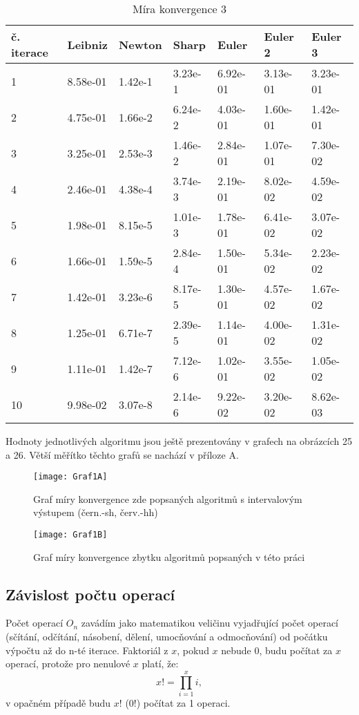\documentclass[soc]{gzwroc} %
\begin{document}
\begin{table}[h!]
\caption{Míra konvergence 3}
\begin{tabular}{|l|l|l|l|l|l|l|}
\hline
\multicolumn{1}{|l|}{\bfseries č. iterace} & \multicolumn{1}{l|}{\bfseries Leibniz} & \multicolumn{1}{l|}{\bfseries Newton} & \multicolumn{1}{l|}{\bfseries Sharp} & \multicolumn{1}{l|}{\bfseries Euler} & \multicolumn{1}{l|}{\bfseries Euler 2} & \multicolumn{1}{l|}{\bfseries Euler 3}  \\ \hline
1 & 8.58e-01 & 1.42e-1 & 3.23e-1 & 6.92e-01 & 3.13e-01 & 3.23e-01 \\ \hline 
2 & 4.75e-01 & 1.66e-2 & 6.24e-2 & 4.03e-01 & 1.60e-01 & 1.42e-01 \\ \hline 
3 & 3.25e-01 & 2.53e-3 & 1.46e-2 & 2.84e-01 & 1.07e-01 & 7.30e-02 \\ \hline 
4 & 2.46e-01 & 4.38e-4 & 3.74e-3 & 2.19e-01 & 8.02e-02 & 4.59e-02 \\ \hline 
5 & 1.98e-01 & 8.15e-5 & 1.01e-3 & 1.78e-01 & 6.41e-02 & 3.07e-02 \\ \hline 
6 & 1.66e-01 & 1.59e-5 & 2.84e-4 & 1.50e-01 & 5.34e-02 & 2.23e-02 \\ \hline 
7 & 1.42e-01 & 3.23e-6 & 8.17e-5 & 1.30e-01 & 4.57e-02 & 1.67e-02 \\ \hline 
8 & 1.25e-01 & 6.71e-7 & 2.39e-5 & 1.14e-01 & 4.00e-02 & 1.31e-02 \\ \hline 
9 & 1.11e-01 & 1.42e-7 & 7.12e-6 & 1.02e-01 & 3.55e-02 & 1.05e-02 \\ \hline 
10 & 9.98e-02 & 3.07e-8 & 2.14e-6 & 9.22e-02 & 3.20e-02 & 8.62e-03 \\ \hline 
\end{tabular}
\end{table}
Hodnoty jednotlivých algoritmu jsou ještě prezentovány v grafech na obrázcích 25 a 26. Větší měřítko těchto grafů se nachází v příloze A.
\begin{figure}[!ht]
\texttt{[image: Graf1A]}
\caption{Graf míry konvergence zde popsaných algoritmů s intervalovým výstupem (čern.-sh, červ.-hh)}
\label{fig:graf1}
\end{figure}
\begin{figure}[!ht]
\texttt{[image: Graf1B]}
\caption{Graf míry konvergence zbytku algoritmů popsaných v této práci}
\label{fig:graf1}
\end{figure}
\subsection{Závislost počtu operací}
Počet operací $O_n$ zavádím jako matematikou veličinu vyjadřující počet operací (sčítání, odčítání, násobení, dělení, umocňování a odmocňování) od počátku výpočtu až do n-té iterace. Faktoriál z $x$, pokud $x$ nebude 0, budu počítat za $x$ operací, protože pro nenulové $x$ platí, že:
$$
x!=\prod_{i=1}^{x} i,
$$
v opačném případě budu $x!$ (0!) počítat za 1 operaci.
\end{document}
